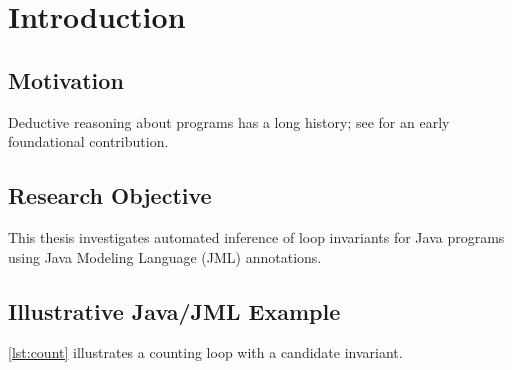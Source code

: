 \chapter{Introduction}
\label{chap:introduction}

\section{Motivation}
Deductive reasoning about programs has a long history; see
\textcite{hoare1969axiomatic} for an early foundational contribution.

\section{Research Objective}
This thesis investigates automated inference of loop invariants for Java
programs using Java Modeling Language (JML) annotations.

\section{Illustrative Java/JML Example}
\cref{lst:count} illustrates a counting loop with a candidate invariant.


